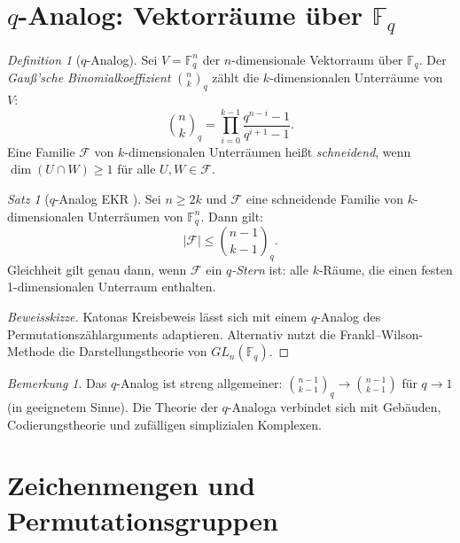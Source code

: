 \documentclass[12pt,a4paper]{amsart}
\theoremstyle{definition}
\theoremstyle{remark}
\newtheorem{satz}[theorem]{Satz}
\newtheorem{bemerkung}[theorem]{Bemerkung}
\newtheorem{definition_de}[theorem]{Definition}
\newcommand{\F}{\mathbb{F}}
\begin{document}
\section{$q$-Analog: Vektorräume über $\mathbb{F}_q$}\label{sec:q_analog}

\begin{definition_de}[$q$-Analog]
Sei $V = \F_q^n$ der $n$-dimensionale Vektorraum über $\F_q$. Der
\emph{Gauß'sche Binomialkoeffizient} $\binom{n}{k}_q$ zählt die $k$-dimensionalen
Unterräume von $V$:
\[
  \binom{n}{k}_q = \prod_{i=0}^{k-1} \frac{q^{n-i} - 1}{q^{i+1} - 1}.
\]
Eine Familie $\mathcal{F}$ von $k$-dimensionalen Unterräumen heißt
\emph{schneidend}, wenn $\dim(U \cap W) \geq 1$ für alle $U, W \in \mathcal{F}$.
\end{definition_de}

\begin{satz}[$q$-Analog EKR \cite{FranklWilson1986}]\label{satz:q_ekr}
Sei $n \geq 2k$ und $\mathcal{F}$ eine schneidende Familie von $k$-dimensionalen
Unterräumen von $\F_q^n$. Dann gilt:
\[
  |\mathcal{F}| \leq \binom{n-1}{k-1}_q.
\]
Gleichheit gilt genau dann, wenn $\mathcal{F}$ ein \emph{$q$-Stern} ist: alle
$k$-Räume, die einen festen 1-dimensionalen Unterraum enthalten.
\end{satz}

\begin{proof}[Beweisskizze]
Katonas Kreisbeweis lässt sich mit einem $q$-Analog des Permutationszählarguments
adaptieren. Alternativ nutzt die Frankl--Wilson-Methode die Darstellungstheorie
von $GL_n(\F_q)$.
\end{proof}

\begin{bemerkung}
Das $q$-Analog ist streng allgemeiner: $\binom{n-1}{k-1}_q \to \binom{n-1}{k-1}$
für $q \to 1$ (in geeignetem Sinne). Die Theorie der $q$-Analoga verbindet sich
mit Gebäuden, Codierungstheorie und zufälligen simplizialen Komplexen.
\end{bemerkung}

\section{Zeichenmengen und Permutationsgruppen}\label{sec:zeichen}
\end{document}
